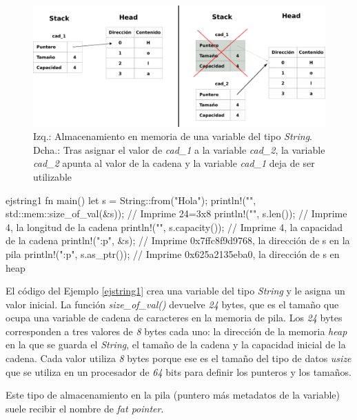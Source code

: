 \documentclass[a4paper,11pt]{extarticle}
\begin{document}
\begin{figure}[htb]
	\centering
	\includegraphics[width=0.9\linewidth]{img/memoria_1.png}
	\caption{Izq.: Almacenamiento en memoria de una variable del tipo \textit{String}. Dcha.: Tras asignar el valor de \textit{cad\_1} a la variable \textit{cad\_2}, la variable \textit{cad\_2} apunta al valor de la cadena y la variable \textit{cad\_1} deja de ser utilizable}
	\label{fig_memoria_1}
\end{figure}

\vspace{0em}
\begin{EjemploCodigo}{ejstring1}
fn main() {
   let s = String::from("Hola");
   println!("{}", std::mem::size_of_val(&s)); // Imprime 24=3x8
   println!("{}", s.len()); // Imprime 4, la longitud de la cadena
   println!("{}", s.capacity()); // Imprime 4, la capacidad de la cadena
   println!("{:p}", &s); // Imprime 0x7ffc8f9d9768, la dirección de s en la pila
   println!("{:p}", s.as_ptr()); // Imprime 0x625a2135eba0, la dirección de s en heap
}
\end{EjemploCodigo}

El código del Ejemplo \ref{ejstring1} crea una variable del tipo \textit{String} y le asigna un valor inicial. La función \textit{size\_of\_val()} devuelve \textit{24} bytes, que es el tamaño que ocupa una variable de cadena de caracteres en la memoria de pila. Los \textit{24} bytes corresponden a tres valores de \textit{8} bytes cada uno: la dirección de la memoria \textit{heap} en la que se guarda el \textit{String}, el tamaño de la cadena y la capacidad inicial de la cadena. Cada valor utiliza \textit{8} bytes porque ese es el tamaño del tipo de datos \textit{usize} que se utiliza en un procesador de \textit{64} bits para definir los punteros y los tamaños.

\begin{Nota}
Este tipo de almacenamiento en la pila (puntero más metadatos de la variable) suele recibir el nombre de \textit{fat pointer}.
\end{Nota}
\end{document}

